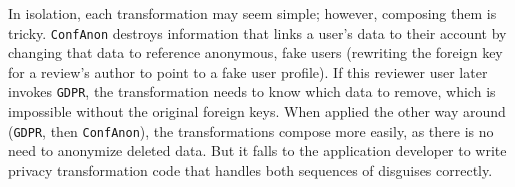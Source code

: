 %
In isolation, each transformation may seem simple; however, composing them is tricky.
%
\texttt{ConfAnon} destroys information that links a user's data to their account by changing
that data to reference anonymous, fake users (\eg rewriting the foreign key for a review's
author to point to a fake user profile).
%
If this reviewer user later invokes \texttt{GDPR}, the transformation needs to know which
data to remove, which is impossible without the original foreign keys.
%
%
When applied the other way around (\texttt{GDPR}, then \texttt{ConfAnon}), the transformations
compose more easily, as there is no need to anonymize deleted data.
%
But it falls to the application developer to write privacy transformation code that handles
both sequences of disguises correctly.
%

